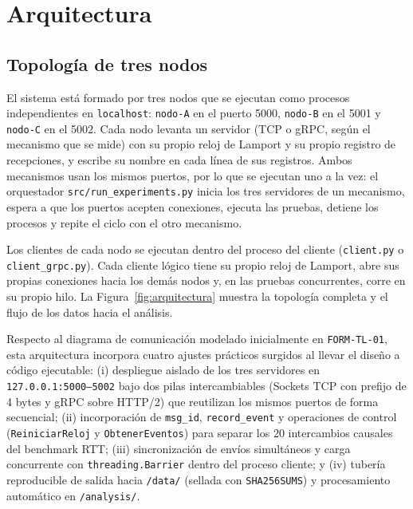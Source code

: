 \documentclass[12pt,a4paper]{article}
\begin{document}
\section{Arquitectura}
\label{sec:arquitectura}

\subsection{Topología de tres nodos}

El sistema está formado por tres nodos que se ejecutan como procesos independientes en \texttt{localhost}: \texttt{nodo-A} en el puerto 5000, \texttt{nodo-B} en el 5001 y \texttt{nodo-C} en el 5002. Cada nodo levanta un servidor (TCP o gRPC, según el mecanismo que se mide) con su propio reloj de Lamport y su propio registro de recepciones, y escribe su nombre en cada línea de sus registros. Ambos mecanismos usan los mismos puertos, por lo que se ejecutan uno a la vez: el orquestador \texttt{src/run\_experiments.py} inicia los tres servidores de un mecanismo, espera a que los puertos acepten conexiones, ejecuta las pruebas, detiene los procesos y repite el ciclo con el otro mecanismo.

Los clientes de cada nodo se ejecutan dentro del proceso del cliente (\texttt{client.py} o \texttt{client\_grpc.py}). Cada cliente lógico tiene su propio reloj de Lamport, abre sus propias conexiones hacia los demás nodos y, en las pruebas concurrentes, corre en su propio hilo. La Figura~\ref{fig:arquitectura} muestra la topología completa y el flujo de los datos hacia el análisis.

Respecto al diagrama de comunicación modelado inicialmente en \texttt{FORM-TL-01}, esta arquitectura incorpora cuatro ajustes prácticos surgidos al llevar el diseño a código ejecutable: (i) despliegue aislado de los tres servidores en \texttt{127.0.0.1:5000--5002} bajo dos pilas intercambiables (Sockets TCP con prefijo de 4 bytes y gRPC sobre HTTP/2) que reutilizan los mismos puertos de forma secuencial; (ii) incorporación de \texttt{msg\_id}, \texttt{record\_event} y operaciones de control (\texttt{ReiniciarReloj} y \texttt{ObtenerEventos}) para separar los 20 intercambios causales del benchmark RTT; (iii) sincronización de envíos simultáneos y carga concurrente con \texttt{threading.Barrier} dentro del proceso cliente; y (iv) tubería reproducible de salida hacia \texttt{/data/} (sellada con \texttt{SHA256SUMS}) y procesamiento automático en \texttt{/analysis/}.
\end{document}
